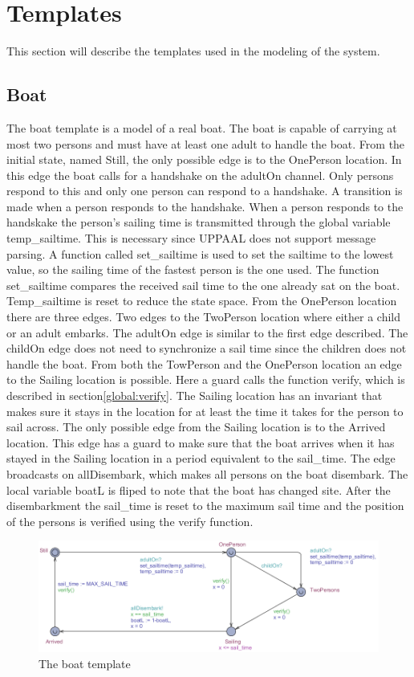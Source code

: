 \section{Templates}
This section will describe the templates used in the modeling of the system.

\subsection{Boat}
The boat template is a model of a real boat. 
The boat is capable of carrying at most two persons and must have at least one adult to handle the boat. 
From the initial state, named Still, the only possible edge is to the OnePerson location. 
In this edge the boat calls for a handshake on the adultOn channel. 
Only persons respond to this and only one person can respond to a handshake.
A transition is made when a person responds to the handshake.  
When a person responds to the handskake the person's sailing time is transmitted through the global variable temp\_sailtime. 
This is necessary since UPPAAL does not support message parsing. 
A function called set\_sailtime is used to set the sailtime to the lowest value, so the sailing time of the fastest person is the one used. 
The function set\_sailtime compares the received sail time to the one already sat on the boat. 
Temp\_sailtime is reset to reduce the state space.
From the OnePerson location there are three edges. 
Two edges to the TwoPerson location where either a child or an adult embarks. 
The adultOn edge is similar to the first edge described. 
The childOn edge does not need to synchronize a sail time since the children does not handle the boat. 
From both the TowPerson and the OnePerson location an edge to the Sailing location is possible. 
Here a guard calls the function verify, which is described in section\ref{global:verify}. 
The Sailing location has an invariant that makes sure it stays in the location for at least the time it takes for the person to sail across. 
The only possible edge from the Sailing location is to the Arrived location. 
This edge has a guard to make sure that the boat arrives when it has stayed in the Sailing location in a period equivalent to the sail\_time. 
The edge broadcasts on allDisembark, which makes all persons on the boat disembark. 
The local variable boatL is fliped to note that the boat has changed site. 
After the disembarkment the sail\_time is reset to the maximum sail time and the position of the persons is verified using the verify function. 
\begin{figure}%
\includegraphics[width=\columnwidth]{pictures/boat.png}%
\caption{The boat template}%
\label{fig:boat}%
\end{figure}
